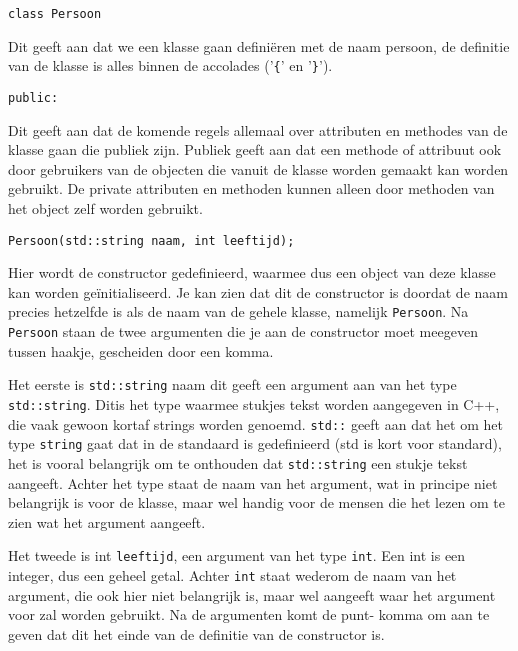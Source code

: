\documentclass{article}
\begin{document}
\begin{lstlisting}[frame=none]
class Persoon 
\end{lstlisting}

Dit geeft aan dat we een klasse gaan definiëren met de naam persoon, de definitie van de klasse is alles binnen de accolades ('\texttt{\{}' en '\texttt{\}}').

\begin{lstlisting}[frame=none]
public:
\end{lstlisting}

Dit geeft aan dat de komende regels allemaal over attributen en methodes van de klasse gaan die publiek zijn. Publiek geeft aan dat een methode of attribuut ook door gebruikers van de objecten die vanuit de klasse worden gemaakt kan worden gebruikt. De private attributen en methoden kunnen alleen door methoden van het object zelf worden gebruikt.

\begin{lstlisting}[frame=none]
Persoon(std::string naam, int leeftijd);
\end{lstlisting}

Hier wordt de constructor gedefinieerd, waarmee dus een object van deze klasse kan worden geïnitialiseerd. Je kan zien dat dit de constructor is doordat de naam precies hetzelfde is als de naam van de gehele klasse, namelijk \texttt{Persoon}. Na \texttt{Persoon} staan de twee argumenten die je aan de constructor moet meegeven tussen haakje, gescheiden door een komma.

Het eerste is \texttt{std::string} naam dit geeft een argument aan van het type \texttt{std::string}. Ditis het type waarmee stukjes tekst worden aangegeven in C++, die vaak gewoon kortaf strings worden genoemd. \texttt{std::} geeft aan dat het om het type \texttt{string} gaat dat in de standaard is gedefinieerd (std is kort voor standard), het is vooral belangrijk om te onthouden dat \texttt{std::string} een stukje tekst aangeeft. Achter het type staat de naam van het argument, wat in principe niet belangrijk is voor de klasse, maar wel handig voor de mensen die het lezen om te zien wat het argument aangeeft.

Het tweede is int \texttt{leeftijd}, een argument van het type \texttt{int}. Een int is een integer, dus een geheel getal. Achter \texttt{int} staat wederom de naam van het argument, die ook hier niet belangrijk is, maar wel aangeeft waar het argument voor zal worden gebruikt. Na de argumenten komt de punt- komma om aan te geven dat dit het einde van de definitie van de constructor is.
\end{document}
